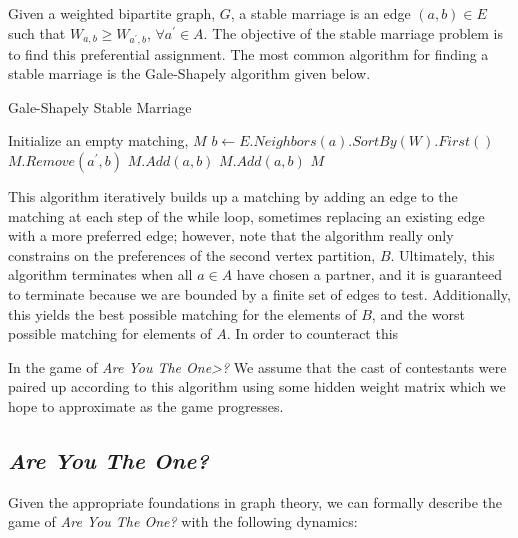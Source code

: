 \documentclass{article}
\begin{document}
Given a weighted bipartite graph, $G$, a stable marriage is an
edge $(a, b) \in E$ such that $W_{a, b} \geq W_{a^\prime, b}$,
$\forall a^\prime \in A$. The objective of the stable marriage
problem is to find this preferential assignment. The most common
algorithm for finding a stable marriage is the Gale-Shapely algorithm
given below.

\begin{algorithm}
  \caption{Gale-Shapely Stable Marriage}\label{alg:gale-shapely}
  \begin{algorithmic}[1]
    \State Initialize an empty matching, $M$
    \State $b \gets E.Neighbors(a).SortBy(W).First()$
    \State $M.Remove(a^\prime, b)$
    \State $M.Add(a, b)$
    \EndIf
    \Else
    \State $M.Add(a, b)$
    \EndIf
    \EndWhile
    \Return $M$
    \EndProcedure
  \end{algorithmic}
\end{algorithm}

This algorithm iteratively builds up a matching by adding an edge
to the matching at each step of the while loop, sometimes replacing
an existing edge with a more preferred edge; however, note that the
algorithm really only constrains on the preferences of the second vertex
partition, $B$. Ultimately, this algorithm terminates when all $a \in A$
have chosen a partner, and it is guaranteed to terminate because we are
bounded by a finite set of edges to test. Additionally, this yields the
best possible matching for the elements of $B$, and the worst possible
matching for elements of $A$. In order to counteract this

In the game of \textit{Are You The One>?} We assume that the cast of
contestants were paired up according to this algorithm using some hidden
weight matrix which we hope to approximate as the game progresses.


\subsection{\textit{Are You The One?}}

Given the appropriate foundations in graph theory, we can formally describe
the game of \textit{Are You The One?} with the following dynamics:
\end{document}
